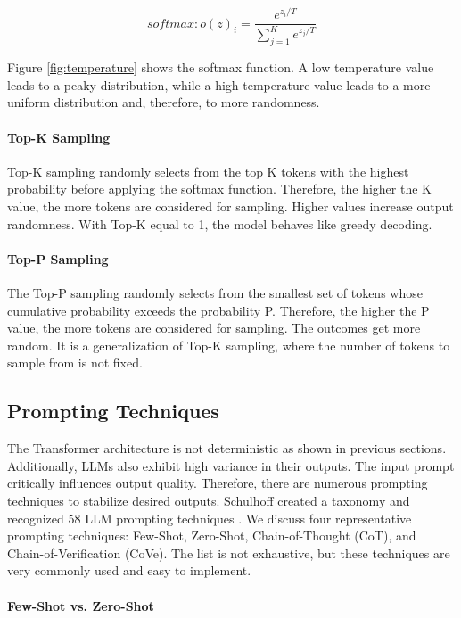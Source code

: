 $$softmax: o(z)_i = \frac{e^{z_i/T}}{\sum_{j=1}^K e^{z_j/T}}$$

Figure \ref{fig:temperature} shows the softmax function. A low temperature value leads to a peaky distribution, while a high temperature value leads to a more uniform distribution and, therefore, to more randomness.


\paragraph{Top-K Sampling}
Top-K sampling \cite{Fan.13.05.2018} randomly selects from the top K tokens with the highest probability before applying the softmax function. Therefore, the higher the K value, the more tokens are considered for sampling. Higher values increase output randomness. With Top-K equal to 1, the model behaves like greedy decoding.

\paragraph{Top-P Sampling}
The Top-P sampling \cite{Holtzman.22.04.2019} randomly selects from the smallest set of tokens whose cumulative probability exceeds the probability P. Therefore, the higher the P value, the more tokens are considered for sampling. The outcomes get more random. It is a generalization of Top-K sampling, where the number of tokens to sample from is not fixed.

\subsection{Prompting Techniques}
The Transformer architecture is not deterministic as shown in previous sections. Additionally, LLMs also exhibit high variance in their outputs. The input prompt critically influences output quality. Therefore, there are numerous prompting techniques to stabilize desired outputs. Schulhoff created a taxonomy and recognized 58 LLM prompting techniques \cite{Schulhoff.06.06.2024}. We discuss four representative prompting techniques: Few-Shot, Zero-Shot, Chain-of-Thought (CoT), and Chain-of-Verification (CoVe). The list is not exhaustive, but these techniques are very commonly used and easy to implement.

\paragraph{Few-Shot vs. Zero-Shot}

